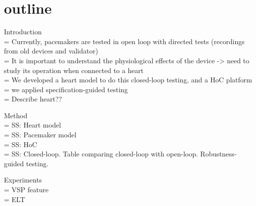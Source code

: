 \section{outline}

Introduction \\
= Currently, pacemakers are tested in open loop with directed tests (recordings from old devices and validator)
\\
= It is important to understand the physiological effects of the device -> need to study its operation when connected to a heart
\\
= We developed a heart model to do this closed-loop testing, and a HoC platform
\\
= we applied specification-guided testing
\\
= Describe heart??

Method \\
= SS: Heart model 
\\
= SS: Pacemaker model
\\
= SS: HoC 
\\
= SS: Closed-loop.
Table comparing closed-loop with open-loop.
Robustness-guided testing.


Experiments \\
= VSP feature
\\
= ELT
